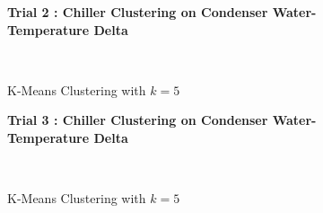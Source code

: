 \begin{figure}[!h]
\centerline{\bfseries\Large Trial 2 : Chiller Clustering on Condenser Water-Temperature Delta}\\
\caption{K-Means Clustering with $k=5$}
\end{figure}
\begin{figure}[!h]
\centerline{\bfseries\Large Trial 3 : Chiller Clustering on Condenser Water-Temperature Delta}\\
\caption{K-Means Clustering with $k=5$}
\end{figure}
